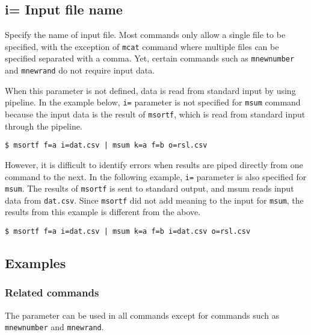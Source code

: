%

\subsection{i= Input file name\label{sect:option_i}}
Specify the name of input file.
Most commands only allow a single file to be specified, with the exception of \verb|mcat| command where multiple files can be specified separated with a comma.
Yet, certain commands such as \verb|mnewnumber| and \verb|mnewrand| do not require input data. 

When this parameter is not defined, data is read from standard input by using pipeline. In the example below, \verb|i=| parameter is not specified for \verb|msum| command because the input data is the result of \verb|msortf|, which is read from standard input through the pipeline.

\begin{Verbatim}[baselinestretch=0.7,frame=single]
$ msortf f=a i=dat.csv | msum k=a f=b o=rsl.csv
\end{Verbatim}

However, it is difficult to identify errors when results are piped directly from one command to the next. 
In the following example, \verb|i=| parameter is also specified for \verb|msum|. 
The results of \verb|msortf| is sent to standard output, and msum reads input data from \verb|dat.csv|. 
Since \verb|msortf| did not add meaning to the input for \verb|msum|, the results from this example is different from the above. 

\begin{Verbatim}[baselinestretch=0.7,frame=single]
$ msortf f=a i=dat.csv | msum k=a f=b i=dat.csv o=rsl.csv
\end{Verbatim}

\subsection*{Examples}


\subsubsection*{Related commands}
The parameter can be used in all commands except for commands such as \verb|mnewnumber| and \verb|mnewrand|.

%

